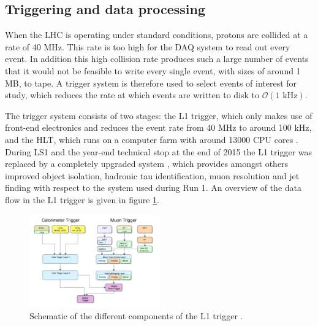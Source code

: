 
\subsection{Triggering and data processing}
\label{sec:CMSLHC_CMS_trigger}
When the \ac{LHC} is operating under standard conditions, protons are collided at a rate
of 40 MHz. This rate is too high for the \ac{DAQ} system to read out every event. In
addition this high collision rate produces such a large number of events that it would
not be feasible to write every single event, with sizes of around 1 MB, to tape. A trigger
system is therefore used to select events of interest for study, which reduces the rate
at which events are written to disk to  $\mathcal{O}(1 \text{ kHz})$.

The trigger system consists of two stages: the \ac{L1} trigger, which only makes use of
front-end electronics 
and reduces the event rate from 40 MHz to around 100 kHz, and the
\ac{HLT}, which runs on a computer farm with around 13000 CPU cores \cite{cms-trigger}.
During \ac{LS1} and the year-end technical stop at the end of 2015 the \ac{L1} trigger was
replaced by a completely upgraded system \cite{cms-trigger-tdr}, which provides amongst others 
improved object isolation, hadronic tau identification, muon \pT resolution and
jet finding with respect to the system used during Run 1.
An overview of the data flow in the \ac{L1} trigger is given in figure \ref{fig:CMS_Trigger}.

\begin{figure}[h!]
\begin{center}
\includegraphics[width=0.5\textwidth]{./Detector/Plots/CMSTrigger.png}
\caption{Schematic of the different components of the \ac{L1} trigger \cite{cms-trigger-tdr}.}
\label{fig:CMS_Trigger}
\end{center}
\end{figure}


